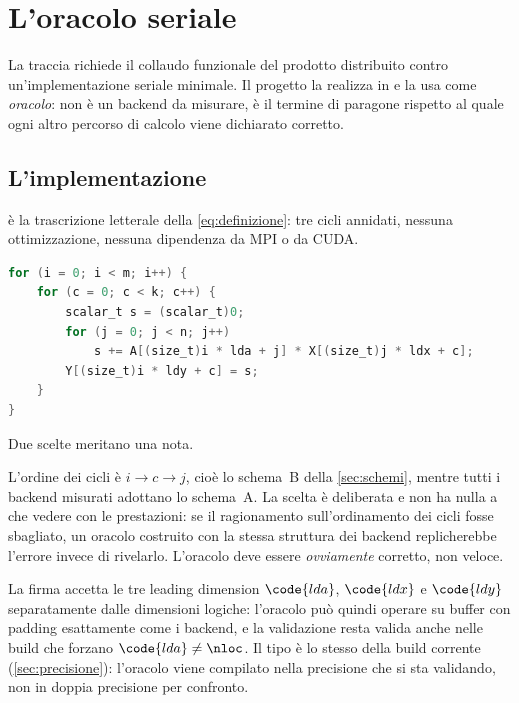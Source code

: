 \chapter{L'oracolo seriale}
\label{app:oracolo}

La traccia richiede il collaudo funzionale del prodotto distribuito contro
un'implementazione seriale minimale. Il progetto la realizza in
 e la usa come \emph{oracolo}: non è un backend da
misurare, è il termine di paragone rispetto al quale ogni altro percorso di
calcolo viene dichiarato corretto.

\section{L'implementazione}
\label{sec:oracolo-implementazione}

 è la trascrizione letterale della \cref{eq:definizione}:
tre cicli annidati, nessuna ottimizzazione, nessuna dipendenza da MPI o da CUDA.

\begin{lstlisting}[language=C,caption={Il nucleo di \file{src/serial/serial.c}.},label={lst:oracolo}]
for (i = 0; i < m; i++) {
    for (c = 0; c < k; c++) {
        scalar_t s = (scalar_t)0;
        for (j = 0; j < n; j++)
            s += A[(size_t)i * lda + j] * X[(size_t)j * ldx + c];
        Y[(size_t)i * ldy + c] = s;
    }
}
\end{lstlisting}

Due scelte meritano una nota.

L'ordine dei cicli è $i \to c \to j$, cioè lo schema~B della
\cref{sec:schemi}, mentre tutti i backend misurati adottano lo schema~A. La
scelta è deliberata e non ha nulla a che vedere con le prestazioni: se il
ragionamento sull'ordinamento dei cicli fosse sbagliato, un oracolo costruito
con la stessa struttura dei backend replicherebbe l'errore invece di
rivelarlo. L'oracolo deve essere \emph{ovviamente} corretto, non veloce.

La firma accetta le tre leading dimension $\code{lda}$, $\code{ldx}$ e
$\code{ldy}$ separatamente dalle dimensioni logiche: l'oracolo può quindi
operare su buffer con padding esattamente come i backend, e la validazione
resta valida anche nelle build che forzano $\code{lda} \neq \nloc$.
Il tipo  è lo stesso della build corrente
(\cref{sec:precisione}): l'oracolo viene compilato nella precisione che si sta
validando, non in doppia precisione per confronto.

